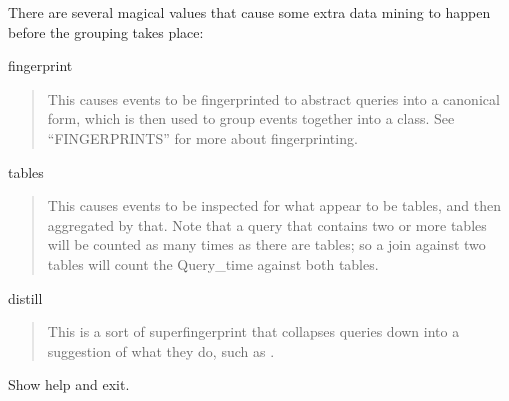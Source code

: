 \documentclass[letterpaper,10pt,english]{sphinxmanual}
\begin{document}
\begin{fulllineitems}
\sphinxAtStartPar
There are several magical values that cause some extra data mining to happen
before the grouping takes place:

\sphinxAtStartPar
fingerprint
\begin{quote}

\sphinxAtStartPar
This causes events to be fingerprinted to abstract queries into
a canonical form, which is then used to group events together into a class.
See “FINGERPRINTS” for more about fingerprinting.
\end{quote}

\sphinxAtStartPar
tables
\begin{quote}

\sphinxAtStartPar
This causes events to be inspected for what appear to be tables, and
then aggregated by that.  Note that a query that contains two or more tables
will be counted as many times as there are tables; so a join against two tables
will count the Query\_time against both tables.
\end{quote}

\sphinxAtStartPar
distill
\begin{quote}

\sphinxAtStartPar
This is a sort of super\sphinxhyphen{}fingerprint that collapses queries down
into a suggestion of what they do, such as .
\end{quote}

\end{fulllineitems}


\begin{fulllineitems}
\label{\detokenize{mariadb-query-digest:cmdoption-mariadb-query-digest-help}}
\sphinxAtStartPar
Show help and exit.

\end{fulllineitems}

\end{document}
